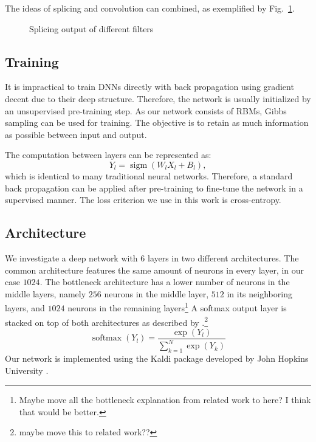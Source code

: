 \documentclass{article}
\DeclareMathOperator*{\sigm}{sigm}
\DeclareMathOperator*{\softmax}{softmax}
\begin{document}
The ideas of splicing and convolution can combined, as exemplified by Fig.~\ref{fig:filtersplice}.
\begin{figure}
 \centerline{}
 \caption{Splicing output of different filters}
 \label{fig:filtersplice}
\end{figure}
 
\subsection{Training}\label{sec:train}
It is impractical to train DNNs directly with back propagation using gradient decent due to their deep structure. Therefore, the network is usually initialized by an unsupervised pre-training step. As our network consists of RBMs, Gibbs sampling can be used for training. The objective is to retain as much information as possible between input and output. 

The computation between layers can be represented as:
\begin{equation}\label{dbn}
Y_{l} = \sigm(W_{l}X_{l} + B_{l}) ,
\end{equation}  
which is identical to many traditional neural networks. Therefore, a standard back propagation can be applied after pre-training to fine-tune the network in a supervised manner. The loss criterion we use in this work is cross-entropy.  

\subsection{Architecture}\label{sec:arch}
We investigate a deep network with $6$ layers in two different architectures. The common architecture features the same amount of neurons in every layer, in our case $1024$. The bottleneck architecture has a lower number of neurons in the middle layers, namely $256$ neurons in the middle layer, $512$ in its neighboring layers, and $1024$ neurons in the remaining layers\footnote{Maybe move all the bottleneck explanation from related work to here? I think that would be better.} 
A softmax output layer is stacked on top of both architectures as described by .\footnote{maybe move this to related work??}
\begin{equation}\label{softmax}
\softmax(Y_{l}) = \frac{\exp(Y_{l})}{\sum_{k=1}^N \exp(Y_{k})}
\end{equation}
Our network is implemented using the Kaldi package developed by John Hopkins University \cite{povey2011kaldi}.
 
\end{document}
